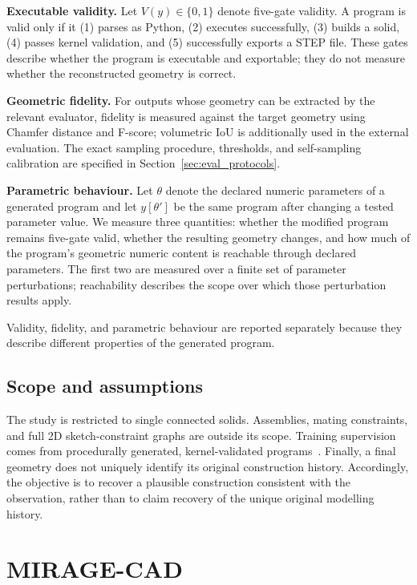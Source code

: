 \documentclass[preprint,12pt]{elsarticle}
\begin{document}
\textbf{Executable validity.}
Let $V(y) \in \{0,1\}$ denote five-gate validity. A program is valid only if it
(1) parses as Python, (2) executes successfully, (3) builds a solid,
(4) passes kernel validation, and (5) successfully exports a STEP file. These
gates describe whether the program is executable and exportable; they do not
measure whether the reconstructed geometry is correct.

\textbf{Geometric fidelity.}
For outputs whose geometry can be extracted by the relevant evaluator, fidelity
is measured against the target geometry using Chamfer distance and F-score;
volumetric IoU is additionally used in the external evaluation. The exact
sampling procedure, thresholds, and self-sampling calibration are specified in
Section~\ref{sec:eval_protocols}.

\textbf{Parametric behaviour.}
Let $\theta$ denote the declared numeric parameters of a generated program and
let $y[\theta']$ be the same program after changing a tested parameter value.
We measure three quantities: whether the modified program remains five-gate
valid, whether the resulting geometry changes, and how much of the program's
geometric numeric content is reachable through declared parameters. The first
two are measured over a finite set of parameter perturbations; reachability
describes the scope over which those perturbation results apply.

Validity, fidelity, and parametric behaviour are reported separately because
they describe different properties of the generated program.

\subsection{Scope and assumptions}
\label{sec:formulation_scope}

The study is restricted to single connected solids. Assemblies, mating
constraints, and full 2D sketch-constraint graphs are outside its scope.
Training supervision comes from procedurally generated, kernel-validated
programs~\cite{zhan2026fllumaonecodenativemultimodalcad}. Finally, a final
geometry does not uniquely identify its original construction history.
Accordingly, the objective is to recover a plausible construction consistent
with the observation, rather than to claim recovery of the unique original
modelling history.

\section{MIRAGE-CAD}
\label{sec:method}
\end{document}
